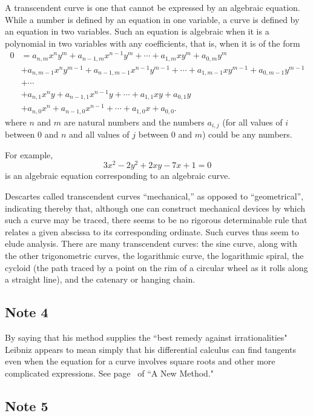 \documentclass[twoside,openright]{article}
\begin{document}
A transcendent curve is one that cannot be expressed by an algebraic
equation.  While a number is defined by an equation in one variable, a
curve is defined by an equation in two variables.  Such an equation is
algebraic when it is a polynomial in two variables with any
coefficients, that is, when it is of the form
\begin{align*}
0 & = a_{n,m}x^ny^m + a_{n-1,m}x^{n-1}y^m + \cdots + a_{1,m}xy^{m} + a_{0,m}y^m\\
&+ a_{n,m-1}x^ny^{m-1} + a_{n-1,m-1}x^{n-1}y^{m-1} + \cdots + a_{1,m-1}xy^{m-1} + a_{0,m-1}y^{m-1} \\
& +\cdots \\
&+ a_{n,1}x^ny + a_{n-1,1}x^{n-1}y+ \cdots + a_{1,1}xy+ a_{0,1}y \\
& +a_{n,0}x^n + a_{n-1,0}x^{n-1}+ \cdots + a_{1,0}x+ a_{0,0}.
\end{align*}
where $n$ and $m$ are natural numbers and the numbers $a_{i,j}$ (for
all values of $i$ between 0 and $n$ and all values of $j$ between 0
and $m$) could be any numbers.

For example,
 $$3x^2 - 2y^2 + 2xy - 7x + 1 = 0$$
is an algebraic equation corresponding to an algebraic curve.  

Descartes called transcendent curves ``mechanical,'' as opposed to
``geometrical'', indicating thereby that, although one can construct
mechanical devices by which such a curve may be traced, there seems to
be no rigorous determinable rule that relates a given abscissa to its
corresponding ordinate. Such curves thus seem to elude analysis. There
are many transcendent curves: the sine curve, along with the other
trigonometric curves, the logarithmic curve, the logarithmic spiral,
the cycloid (the path traced by a point on the rim of a circular wheel
as it rolls along a straight line), and the catenary or hanging chain.

\subsection*{Note 4}
\label{crg4}

By saying that his method supplies the ``best remedy against
irrationalities" Leibniz appears to mean simply that his differential
calculus can find tangents even when the equation for a curve involves
square roots and other more complicated expressions.  See
page~\pageref{nmdiffeq} of ``A New Method."

\subsection*{Note 5}
\label{crg5}
\end{document}
